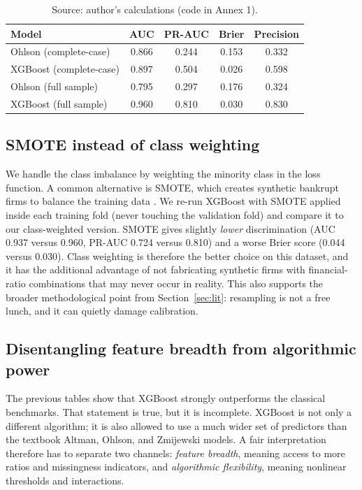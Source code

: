 \documentclass[12pt,a4paper]{article}
\begin{document}
\begin{table}[H]
\centering
\caption{Complete-case analysis at H1 (rows with no missing values,
$n=3{,}031$, bankruptcy rate 3.4\%). Full-sample figures shown for comparison.}
\label{tab:robust-cc}
\small
\begin{tabular}{lcccc}
\toprule
Model & AUC & PR-AUC & Brier & Precision \\
\midrule
Ohlson (complete-case)  & 0.866 & 0.244 & 0.153 & 0.332 \\
XGBoost (complete-case) & 0.897 & 0.504 & 0.026 & 0.598 \\
\midrule
Ohlson (full sample)    & 0.795 & 0.297 & 0.176 & 0.324 \\
XGBoost (full sample)   & 0.960 & 0.810 & 0.030 & 0.830 \\
\bottomrule
\end{tabular}
\caption*{\footnotesize Source: author's calculations (code in Annex 1).}
\end{table}

\subsection{SMOTE instead of class weighting}

We handle the class imbalance by weighting the minority class in the loss
function. A common alternative is SMOTE, which creates synthetic bankrupt
firms to balance the training data \citep{chawla2002}. We re-run XGBoost with
SMOTE applied inside each training fold (never touching the validation fold)
and compare it to our class-weighted version. SMOTE gives slightly
\emph{lower} discrimination (AUC 0.937 versus 0.960, PR-AUC 0.724 versus
0.810) and a worse Brier score (0.044 versus 0.030). Class weighting is
therefore the better choice on this dataset, and it has the additional
advantage of not fabricating synthetic firms with financial-ratio
combinations that may never occur in reality. This also supports the broader
methodological point from Section~\ref{sec:lit}: resampling is not a free
lunch, and it can quietly damage calibration.

\subsection{Disentangling feature breadth from algorithmic power}
\label{sec:feature-breadth}

The previous tables show that XGBoost strongly outperforms the classical
benchmarks. That statement is true, but it is incomplete. XGBoost is not only
a different algorithm; it is also allowed to use a much wider set of predictors
than the textbook Altman, Ohlson, and Zmijewski models. A fair interpretation
therefore has to separate two channels: \emph{feature breadth}, meaning access
to more ratios and missingness indicators, and \emph{algorithmic flexibility},
meaning nonlinear thresholds and interactions.
\end{document}
